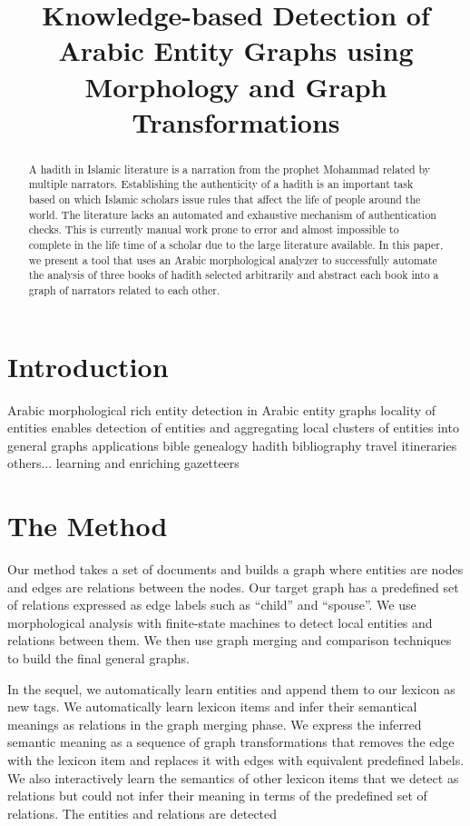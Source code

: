 \documentclass{llncs}
\title{Knowledge-based Detection of Arabic Entity Graphs using Morphology and Graph Transformations}
\date{}
\begin{document}
\maketitle

\begin{abstract}
A hadith in Islamic literature is a narration from the 
prophet Mohammad related by multiple narrators.
Establishing the authenticity of a hadith is an important task
based on which Islamic scholars issue rules that affect the life
of people around the world. 
The literature lacks an automated and exhaustive mechanism of 
authentication checks. 
This is currently manual work prone to error and almost
impossible to complete in the life time of a scholar due to the
large literature available. 
In this paper, we present a tool that uses 
an Arabic morphological analyzer 
to successfully automate the
analysis of three books of hadith selected 
arbitrarily and abstract 
each book into a graph of narrators related to each other. 
\end{abstract}


\section{Introduction}
 Arabic morphological rich
 entity detection in Arabic
 entity graphs
 locality of entities enables detection of entities and aggregating local clusters of entities into general graphs
 applications
 	bible genealogy 
 	hadith
 	bibliography
	travel itineraries
	others...
 learning and enriching gazetteers 
 
\section{The Method}

Our method takes a set of documents and builds 
a graph where entities are nodes and edges are relations between the nodes. 
Our target graph has a predefined set of relations expressed as edge labels such as ``child'' and ``spouse''.
We use morphological analysis with finite-state machines to detect local entities and
relations between them.
We then use graph merging and comparison techniques to build the final general graphs.

In the sequel, we automatically learn entities and append them to our lexicon as new tags. 
We automatically learn lexicon items and infer their semantical meanings as relations in the 
graph merging phase. We express the inferred semantic meaning as a sequence of graph transformations
that removes the edge with the lexicon item and replaces it with edges with equivalent predefined labels.
We also interactively learn the semantics of other lexicon items that we detect as relations but could not infer their meaning 
in terms of the predefined set of relations.
The entities and relations are detected 
\end{document}

